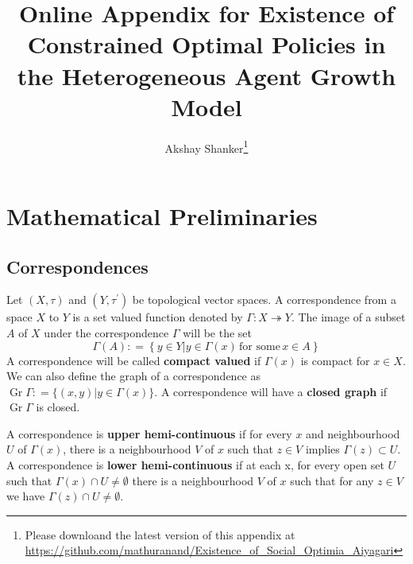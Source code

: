 \documentclass[12pt]{ectaart}
\DeclareMathOperator{\Gr}{Gr}
\newcommand{\1}{\mathbbm 1}
\theoremstyle{plain}
\theoremstyle{definition}
\begin{document}
 	
 	
 	
 	
 	
 	
 	\title{Online Appendix for Existence of Constrained Optimal Policies in the Heterogeneous Agent Growth Model}
 	
 	
 	\author{Akshay Shanker\thanks{Please downloand the latest version of this appendix at \url{https://github.com/mathuranand/Existence_of_Social_Optimia_Aiyagari}
 	}}
 	
 	
 	
 	
 	
 	
 	
 	
 	\maketitle
 	
\section{Mathematical Preliminaries}\label{sec: appexa}


\subsection{Correspondences}\label{sec: corr}

Let $(X,\tau)$ and $(Y, \tau^{\prime})$ be topological vector spaces. A correspondence from a space $X$ to $Y$ is a set valued function denoted by $\Gamma\colon X\twoheadrightarrow Y$. The image of a subset $A$ of $X$ under the  correspondence $\Gamma$ will be the set \[\Gamma\left(A\right)\colon=\left\{ y\in Y\vert y\in\Gamma\left(x\right)\,\text{for some}\,x\in A\right\}\]A correspondence will be called \textbf{compact valued} if $\Gamma(x)$ is compact for $x\in X$. We can also define the graph of a correspondence as
$\Gr\Gamma\colon= \{(x,y)\vert y\in \Gamma(x)\}$. A correspondence will have a \textbf{closed graph} if $\Gr\Gamma$ is closed. 


A correspondence is \textbf{upper hemi-continuous} if for every $x$ and neighbourhood $U$ of $\Gamma(x)$, there is a neighbourhood $V$ of $x$ such that $z\in V$ implies $\Gamma(z)\subset U$. A correspondence is \textbf{lower hemi-continuous} if at each x, for every open set $U$ such that $\Gamma(x)\cap U \not= \emptyset$ there is a neighbourhood $V$ of $x$ such that for any $z\in V$ we have $\Gamma(z)\cap U \not= \emptyset$.  
\end{document}
